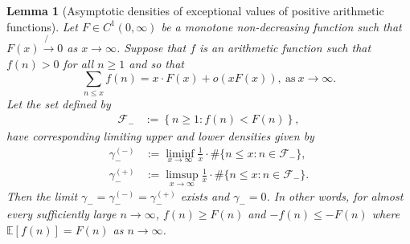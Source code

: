 \documentclass[11pt,reqno,a4letter]{article}
\numberwithin{figure}{section}
\numberwithin{table}{section}
\theoremstyle{plain}
\newtheorem{lemma}[theorem]{Lemma}
\numberwithin{theorem}{section}
\theoremstyle{definition}
\begin{document}
\begin{lemma}[Asymptotic densities of exceptional values of positive arithmetic functions] 
\label{lemma_AsymptoticDensitiesOfExceptionalSets_v1}
\label{remark_AsymptoticDensitiesOfExceptionalSets_v1}
Let $F \in C^{1}(0, \infty)$ be a monotone non-decreasing function such that 
$F(x) \not{\rightarrow} 0$ as $x \rightarrow \infty$. 
Suppose that $f$ is an arithmetic function such that $f(n) > 0$ for all $n \geq 1$ and so that 
\[
\sum_{n \leq x} f(n) = x \cdot F(x) + o(xF(x)), \mathrm{\ as\ } x \rightarrow \infty. 
\]
Let the set defined by 
\begin{align*} 
\mathcal{F}_{-} & := \left\{n \geq 1: f(n) < F(n)\right\}, 
\end{align*} 
have corresponding limiting upper and lower densities given by 
\begin{align*} 
\gamma_{-}^{(-)} & := \liminf_{x \rightarrow \infty} \frac{1}{x} \cdot \#\{n \leq x: n \in \mathcal{F}_{-}\}, \\ 
\gamma_{-}^{(+)} & := \limsup_{x \rightarrow \infty} \frac{1}{x} \cdot \#\{n \leq x: n \in \mathcal{F}_{-}\}. 
\end{align*} 
Then the limit $\gamma_{-} = \gamma_{-}^{(-)} = \gamma_{-}^{(+)}$ exists and $\gamma_{-} = 0$. 
In other words, for almost every sufficiently large $n \rightarrow \infty$, 
$f(n) \geq F(n)$ and $-f(n) \leq -F(n)$ where $\mathbb{E}[f(n)] = F(n)$ as $n \rightarrow \infty$. 
\end{lemma} 
\end{document}

